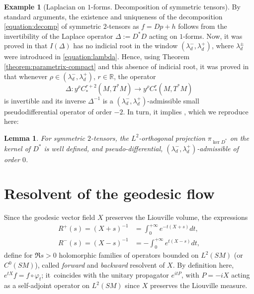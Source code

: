 \documentclass[10pt]{amsart}
\newcommand{\R}{\mathbb{R}}
\theoremstyle{plain}
\newtheorem{lemma}{Lemma}[section]
\theoremstyle{definition}
\newtheorem{example}{Example}[section]
\begin{document}
\begin{example}[Laplacian on $1$-forms. Decomposition of symmetric tensors]
\label{example:dec}
By standard arguments, the existence and uniqueness of the decomposition \eqref{equation:decomp} of symmetric $2$-tensors as $f = Dp + h$ follows from the invertibility of the Laplace operator $\Delta := D^*D$ acting on $1$-forms. Now, it was proved in \cite[Lem.\,5.4]{Bonthonneau-Lefeuvre-19-1} that $I(\Delta)$ has no indicial root in the window $(\lambda_d^-, \lambda_d^+)$, where $\lambda_d^\pm$ were introduced in \eqref{equation:lambda}. Hence, using Theorem \ref{theorem:parametrix-compact} and this absence of indicial root, it was proved in \cite[Lem.\,5.4]{Bonthonneau-Lefeuvre-19-1} that whenever $\rho \in (\lambda_d^-, \lambda_d^+)$, $r \in \R$, the operator
\[
\Delta : y^\rho C^{r+2}_*(M,T^*M) \to y^\rho C^r_*(M,T^*M)
\]
is invertible and its inverse $\Delta^{-1}$ is a $(\lambda_d^-,\lambda_d^+)$-admissible small pseudodifferential operator of order $-2$. In turn, it implies \cite[Lem.\,5.5]{Bonthonneau-Lefeuvre-19-1}, which we reproduce here:
\begin{lemma}
\label{lemma:proj-ker-D^ast-admissible}
For symmetric $2$-tensors, the $L^2$-orthogonal projection $\pi_{\ker D^\ast}$ on the kernel of $D^\ast$ is well defined, and pseudo-differential, $(\lambda_d^-, \lambda_d^+)$-admissible of order $0$.
\end{lemma}
\end{example}

\section{Resolvent of the geodesic flow}
\label{sec:resolvent}

Since the geodesic vector field $X$ preserves the Liouville volume, the expressions
\begin{equation}
\label{equation:resolvent}
\begin{split}
R^+(s) = (X+s)^{-1} &= \int_0^{+\infty} e^{-t(X + s)} dt,\\
R^-(s) = (X-s)^{-1} &= - \int_0^{+\infty} e^{t (X-s)} dt,
\end{split}
\end{equation}
define for $\Re s \!>\!0$ holomorphic families of operators bounded on $L^2(SM)$ (or~$C^0(SM)$), called \emph{forward} and \emph{backward} resolvent of $X$. {\color{black}By definition here, $e^{tX}f = f\circ \varphi_t$; it~coincides with the unitary propagator $e^{i t P}$, with $P = -iX$ acting as a self-adjoint operator on $L^2(SM)$ since $X$ preserves the Liouville measure.}
\end{document}
